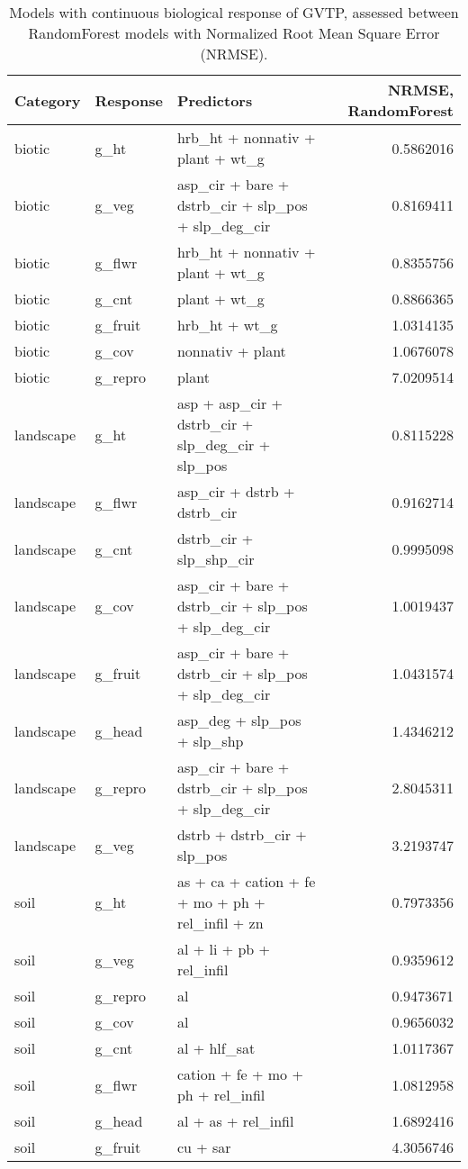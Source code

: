 \documentclass[
]{article}
\begin{document}
\begin{table}

\caption{\label{tab:tab-models-continuous}Models with continuous biological response of GVTP, assessed between RandomForest models with Normalized Root Mean Square Error (NRMSE).}
\centering
\begin{tabular}[t]{l|l|l|r}
\hline
Category & Response & Predictors & NRMSE, RandomForest\\
\hline
biotic & g\_ht & hrb\_ht + nonnativ + plant + wt\_g & 0.5862016\\
\hline
biotic & g\_veg & asp\_cir + bare + dstrb\_cir + slp\_pos + slp\_deg\_cir & 0.8169411\\
\hline
biotic & g\_flwr & hrb\_ht + nonnativ + plant + wt\_g & 0.8355756\\
\hline
biotic & g\_cnt & plant + wt\_g & 0.8866365\\
\hline
biotic & g\_fruit & hrb\_ht + wt\_g & 1.0314135\\
\hline
biotic & g\_cov & nonnativ + plant & 1.0676078\\
\hline
biotic & g\_repro & plant & 7.0209514\\
\hline
landscape & g\_ht & asp + asp\_cir + dstrb\_cir + slp\_deg\_cir + slp\_pos & 0.8115228\\
\hline
landscape & g\_flwr & asp\_cir + dstrb + dstrb\_cir & 0.9162714\\
\hline
landscape & g\_cnt & dstrb\_cir + slp\_shp\_cir & 0.9995098\\
\hline
landscape & g\_cov & asp\_cir + bare + dstrb\_cir + slp\_pos + slp\_deg\_cir & 1.0019437\\
\hline
landscape & g\_fruit & asp\_cir + bare + dstrb\_cir + slp\_pos + slp\_deg\_cir & 1.0431574\\
\hline
landscape & g\_head & asp\_deg + slp\_pos + slp\_shp & 1.4346212\\
\hline
landscape & g\_repro & asp\_cir + bare + dstrb\_cir + slp\_pos + slp\_deg\_cir & 2.8045311\\
\hline
landscape & g\_veg & dstrb + dstrb\_cir + slp\_pos & 3.2193747\\
\hline
soil & g\_ht & as + ca + cation + fe + mo + ph + rel\_infil + zn & 0.7973356\\
\hline
soil & g\_veg & al + li + pb + rel\_infil & 0.9359612\\
\hline
soil & g\_repro & al & 0.9473671\\
\hline
soil & g\_cov & al & 0.9656032\\
\hline
soil & g\_cnt & al + hlf\_sat & 1.0117367\\
\hline
soil & g\_flwr & cation + fe + mo + ph + rel\_infil & 1.0812958\\
\hline
soil & g\_head & al + as + rel\_infil & 1.6892416\\
\hline
soil & g\_fruit & cu + sar & 4.3056746\\
\hline
\end{tabular}
\end{table}
\end{document}
